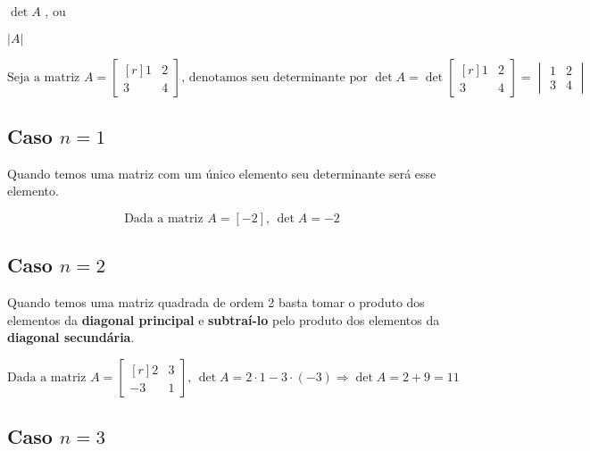 \begin{center}
    \begin{romanlistinline}
        \item $\det A$ , ou \item $|A|$
    \end{romanlistinline}
\end{center}

\Example

$$
\text{Seja a matriz }A=\begin{bmatrix*}[r]
1 & 2\\ 3 & 4
\end{bmatrix*}\text{, denotamos seu determinante por }\det A=\det\begin{bmatrix*}[r]
1 & 2\\ 3 & 4
\end{bmatrix*}=\begin{vmatrix}
1 & 2\\ 3 & 4
\end{vmatrix}
$$

\subsection{Caso \texorpdfstring{$n=1$}{n=1}}

Quando temos uma matriz com um único elemento seu determinante será esse elemento. 

\Example

$$
\text{Dada a matriz }A=[-2]\text{, }\det A=-2
$$

\subsection{Caso \texorpdfstring{$n=2$}{n=2}}

Quando temos uma matriz quadrada de ordem 2 basta tomar o produto dos elementos da \textbf{diagonal principal} e \textbf{subtraí-lo} pelo produto dos elementos da \textbf{diagonal secundária}.

\Example

$$
\text{Dada a matriz }A=\begin{bmatrix*}[r]
    2 & 3\\ -3 & 1
\end{bmatrix*}\text{, }\det A=2\cdot 1 -3\cdot (-3) \Rightarrow \det A=2+9=11 
$$

\subsection{Caso \texorpdfstring{$n=3$}{n=3}}

